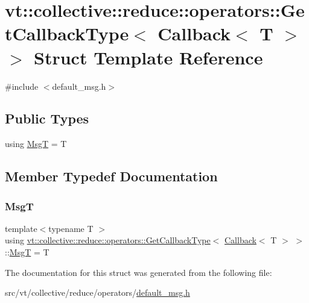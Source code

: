 \hypertarget{structvt_1_1collective_1_1reduce_1_1operators_1_1_get_callback_type_3_01_callback_3_01_t_01_4_01_4}{}\section{vt\+:\+:collective\+:\+:reduce\+:\+:operators\+:\+:Get\+Callback\+Type$<$ Callback$<$ T $>$ $>$ Struct Template Reference}
\label{structvt_1_1collective_1_1reduce_1_1operators_1_1_get_callback_type_3_01_callback_3_01_t_01_4_01_4}


{\ttfamily \#include $<$default\+\_\+msg.\+h$>$}

\subsection*{Public Types}
\begin{DoxyCompactItemize}
\item 
using \hyperlink{structvt_1_1collective_1_1reduce_1_1operators_1_1_get_callback_type_3_01_callback_3_01_t_01_4_01_4_a35c3dc942adbc517eb2a3fcf035a076d}{MsgT} = T
\end{DoxyCompactItemize}


\subsection{Member Typedef Documentation}
\mbox{\label{structvt_1_1collective_1_1reduce_1_1operators_1_1_get_callback_type_3_01_callback_3_01_t_01_4_01_4_a35c3dc942adbc517eb2a3fcf035a076d}} 
\subsubsection{\texorpdfstring{MsgT}{MsgT}}
{\footnotesize\ttfamily template$<$typename T $>$ \\
using \hyperlink{structvt_1_1collective_1_1reduce_1_1operators_1_1_get_callback_type}{vt\+::collective\+::reduce\+::operators\+::\+Get\+Callback\+Type}$<$ \hyperlink{namespacevt_a57b238783d05de96bc2c4027f7073b7f}{Callback}$<$ T $>$ $>$\+::\hyperlink{structvt_1_1collective_1_1reduce_1_1operators_1_1_get_callback_type_3_01_callback_3_01_t_01_4_01_4_a35c3dc942adbc517eb2a3fcf035a076d}{MsgT} =  T}



The documentation for this struct was generated from the following file\+:\begin{DoxyCompactItemize}
\item 
src/vt/collective/reduce/operators/\hyperlink{default__msg_8h}{default\+\_\+msg.\+h}\end{DoxyCompactItemize}
